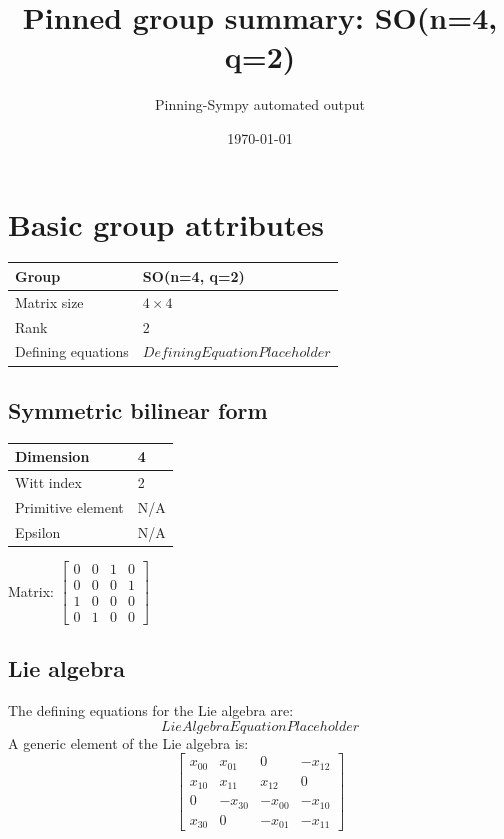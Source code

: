\documentclass[11pt]{article}
\title{Pinned group summary: SO(n=4, q=2)}
\author{Pinning-Sympy automated output}
\date{\today}
\theoremstyle{definition}
\begin{document}
\maketitle
\tableofcontents

\newpage

\section{Basic group attributes}

\begin{tabular}{|l|l|}
	\hline
    Group & SO(n=4, q=2) \\
	\hline
    Matrix size & $4 \times 4$ \\
	\hline
    Rank & $2$ \\
	\hline
	Defining equations & $DefiningEquationPlaceholder$ \\
	\hline
\end{tabular}

\subsection{Symmetric bilinear form}
\begin{tabular}{|l|l|}
    \hline
    Dimension & 4 \\
    \hline
    Witt index & 2 \\
    \hline
    Primitive element & N/A \\
    \hline
    Epsilon & N/A \\
    \hline
\end{tabular}

\bigskip
\noindent Matrix: \(
\left[\begin{matrix}0 & 0 & 1 & 0\\0 & 0 & 0 & 1\\1 & 0 & 0 & 0\\0 & 1 & 0 & 0\end{matrix}\right]
\)



\subsection{Lie algebra}

The defining equations for the Lie algebra are:
\[
LieAlgebraEquationPlaceholder
\]
A generic element of the Lie algebra is:
\[
\left[\begin{matrix}x_{0 0} & x_{0 1} & 0 & - x_{1 2}\\x_{1 0} & x_{1 1} & x_{1 2} & 0\\0 & - x_{3 0} & - x_{0 0} & - x_{1 0}\\x_{3 0} & 0 & - x_{0 1} & - x_{1 1}\end{matrix}\right]
\]
\end{document}
